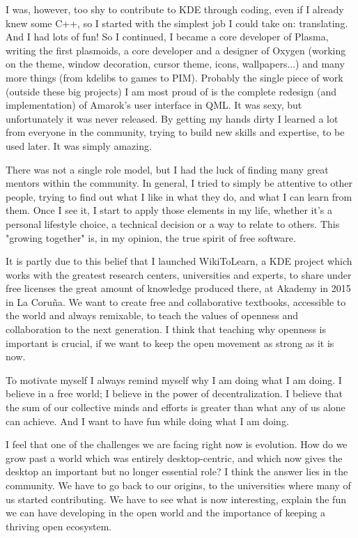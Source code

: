 I was, however, too shy to contribute to KDE through coding, even if I already knew some C++, so I started with the simplest job I could take on: translating. And I had lots of fun! So I continued, I became a core developer of Plasma, writing the first plasmoids, a core developer and a designer of Oxygen (working on the theme, window decoration, cursor theme, icons, wallpapers...) and many more things (from kdelibs to games to PIM). Probably the single piece of work (outside these big projects) I am most proud of is the complete redesign (and implementation) of Amarok's user interface in QML. It was sexy, but unfortunately it was never released.
By getting my hands dirty I learned a lot from everyone in the community, trying to build new skills and expertise, to be used later. It was simply amazing.

There was not a single role model, but I had the luck of finding many great mentors within the community. In general, I tried to simply be attentive to other people, trying to find out what I like in what they do, and what I can learn from them. Once I see it, I start to apply those elements in my life, whether it's a personal lifestyle choice, a technical decision or a way to relate to others. This "growing together" is, in my opinion, the true spirit of free software.

It is partly due to this belief that I launched WikiToLearn, a KDE project which works with the greatest research centers, universities and experts, to share under free licenses the great amount of knowledge produced there, at Akademy in 2015 in La Coru\~{n}a. We want to create free and collaborative textbooks, accessible to the world and always remixable, to teach the values of openness and collaboration to the next generation. I think that teaching why openness is important is crucial, if we want to keep the open movement as strong as it is now.

To motivate myself I always remind myself why I am doing what I am doing. I believe in a free world; I believe in the power of decentralization. I believe that the sum of our collective minds and efforts is greater than what any of us alone can achieve. And I want to have fun while doing what I am doing.

I feel that one of the challenges we are facing right now is evolution. How do we grow past a world which was entirely desktop-centric, and which now gives the desktop an important but no longer essential role? I think the answer lies in the community. We have to go back to our origins, to the universities where many of us started contributing. We have to see what is now interesting, explain the fun we can have developing in the open world and the importance of keeping a thriving open ecosystem.

